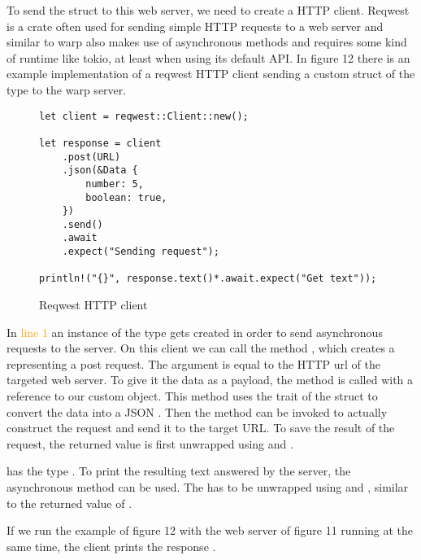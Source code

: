 To send the struct to this web server, we need to create a HTTP client. Reqwest is a crate often used for sending
simple HTTP requests to a web server and similar to warp also makes use of asynchronous methods and requires some kind
of runtime like tokio, at least when using its default API. In figure 12 there is an example implementation of a
reqwest HTTP client sending a custom struct of the type  to the warp server.

\begin{figure}[ht]
    \begin{verbatim}
let client = reqwest::Client::new();

let response = client
    .post(URL)
    .json(&Data {
        number: 5,
        boolean: true,
    })
    .send()
    .await
    .expect("Sending request");

println!("{}", response.text()*.await.expect("Get text"));
    \end{verbatim}
    \caption{Reqwest HTTP client}
\end{figure}

In \textcolor{orange}{line 1} an instance of the type  gets created in order to send asynchronous
requests to the server. On this client we can call the method , which creates a
 representing a post request. The argument  is equal to the HTTP url of the
targeted web server. To give it the data as a payload, the method  is called with a reference to our custom
 object. This method uses the  trait of the struct to convert the data into a JSON
. Then the  method can be invoked to actually construct the request and send it to the target
URL. To save the result of the request, the returned value is first unwrapped using  and .

 has the type . To print the resulting text answered by the server, the
asynchronous method  can be used. The  has to be unwrapped using  and
, similar to the returned value of .

If we run the example of figure 12 with the web server of figure 11 running at the same time, the client prints the
response  .
